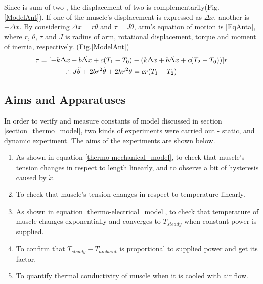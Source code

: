 Since \anta is sum of two \scpnospace, the displacement of two \scp is complementarily(Fig.\ref{ModelAnt}). If one of the muscle's displacement is expressed as $\Delta{x}$, another is $-\Delta{x}$. By considering $\Delta{x}=r\theta$ and $\tau=J\ddot{\theta}$, arm's equation of motion is \eqref{EqAnta}, where $r$, $\theta$, $\tau$ and $J$ is radius of arm, rotational displacement, torque and moment of inertia, respectively.
(Fig.\ref{ModelAnt})
\begin{align}
\tau = [-k\Delta x-b\dot{\Delta x}+c(T_1-T_0) & - (k\Delta x+b\dot{\Delta x}+c(T_2-T_0))]r \notag \\
\therefore J\ddot{\theta}+2br^2\dot{\theta}+2kr^2\theta & =cr(T_1-T_2) \label{EqAnta}
\end{align}

\subsection{Aims and Apparatuses}\label{section_aimsappa}
In order to verify and measure constants of model discussed in section \ref{section_thermo_model}, two kinds of experiments were carried out - static, and dynamic experiment. The aims of the experiments are shown below.

\begin{enumerate} 
\item As shown in equation \eqref{thermo-mechanical_model}, to check that muscle's tension changes in respect to length linearly, and to observe a bit of hysteresis caused by $\dot{x}$.
\item To check that muscle's tension changes in respect to temperature linearly.
\item As shown in equation \eqref{thermo-electrical_model}, to check that temperature of muscle changes exponentially and converges to $T_{steady}$ when constant power is supplied.
\item To confirm that $T_{steady}-T_{ambient}$ is proportional to supplied power and get its factor. 
\item To quantify thermal conductivity of muscle when it is cooled with air flow.
\end{enumerate}

